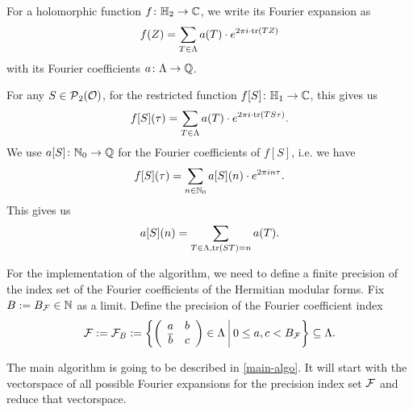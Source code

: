 \begin{remark}
\label{remark:restricted-by-S}
For a holomorphic function $f \colon \mathbb{H}_2 \rightarrow \mathbb{C}$, we write its Fourier expansion as
\[ f(Z) = \sum_{T \in \Lambda} a(T) \cdot e^{2 \pi i \cdot \textup{\textrm{tr}}(T Z)} \]
with its Fourier coefficients $a \colon \Lambda \rightarrow \mathbb{Q}$.

For any $S \in \operatorname{\mathcal{P}}_2(\mathcal{O})$, for the restricted function $f[S] \colon \mathbb{H}_1 \rightarrow \mathbb{C}$, this gives us
\[ f[S](\tau) = \sum_{T \in \Lambda} a(T) \cdot e^{2 \pi i \cdot \textup{\textrm{tr}}(T S \tau)} . \]
We use $a[S] \colon \mathbb{N}_0 \rightarrow \mathbb{Q}$ for the Fourier coefficients of $f[S]$, i.e. we have
\[ f[S](\tau) = \sum_{n \in \mathbb{N}_0} a[S](n) \cdot e^{2 \pi i n \tau} . \]
This gives us
\[ a[S] (n) = \sum_{T \in \Lambda, \textup{\textrm{tr}}(S T) = n} a(T) . \]
\endproof
\end{remark}

For the implementation of the algorithm, we need to define a finite precision of the index set of the Fourier coefficients of the Hermitian modular forms.
Fix $B := B_{\mathcal{F}} \in \mathbb{N}$ as a limit. Define the precision of the Fourier coefficient index
\[ \F := \F_B := \Set{\SimpleMatrix{a}{b}{\overline b}{c} \in \Lambda}{0 \le a , c < B_{\F}} \subseteq \Lambda . \]

The main algorithm is going to be described in \cref{main-algo}. It will start with the vectorspace of all possible Fourier expansions for the precision index set $\mathcal{F}$ and reduce that vectorspace.

